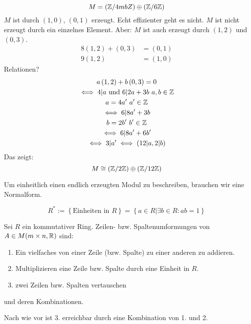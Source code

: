 \begin{Bsp}
  \[M=\left( \mathbb{Z}/4mb{Z} \right) \oplus \left( \mathbb{Z}/6\mathbb{Z} \right)\]
  $M$ ist durch $(1,0)$, $(0,1)$ erzeugt. Echt effizienter geht es nicht. $M$ ist nicht erzeugt durch ein einzelnes Element. Aber: $M$ ist auch erzeugt durch $(1,2)$ und $(0,3)$.
  \begin{align*}
    8\left( 1,2 \right)+\left( 0,3 \right)&=\left( 0,1 \right)\\
    9\left( 1,2 \right)&=\left( 1,0 \right)
  \end{align*}
  Relationen?
  \begin{gather*}
    a\left( 1,2 \right)+b\left( 0,3 \right)=0\\
    \iff 4|a\ \text{und}\ 6|2a+3b\ a,b\in \mathbb{Z}\\
    a=4a'\ a'\in \mathbb{Z}\\
    \iff 6|8a'+3b\\
    b=2b'\ b'\in \mathbb{Z}\\
    \iff 6|8a'+6b'\\
    \iff 3|a'\iff \left( 12|a, 2|b \right) 
  \end{gather*}
  Das zeigt:
  \[M\cong \left( \mathbb{Z}/2\mathbb{Z} \right)\oplus\left( \mathbb{Z}/12\mathbb{Z} \right)\]
\end{Bsp}
\begin{Bem}
  Um einheitlich einen endlich erzeugten Modul zu beschreiben, brauchen wir eine Normalform.
\end{Bem}
\begin{Def}
  \[R^*:=\left\{ \text{Einheiten in $R$} \right\}=\left\{ a\in R|\exists b\in R: ab=1 \right\}\]
\end{Def}
\begin{Def}
  Sei $R$ ein kommutativer Ring. Zeilen- bzw. Spaltenumformungen von $A\in M(m\times n,\mathbb{R})$ sind:
  \begin{enumerate}
    \item Ein vielfaches von einer Zeile (bzw. Spalte) zu einer anderen zu addieren.
    \item Multiplizieren eine Zeile bzw. Spalte durch eine Einheit in $R$.
    \item zwei Zeilen bzw. Spalten vertauschen
  \end{enumerate}
  und deren Kombinationen.
\end{Def}
\begin{Bem}
  Nach wie vor ist 3. erreichbar durch eine Kombination von 1. und 2.
\end{Bem}

